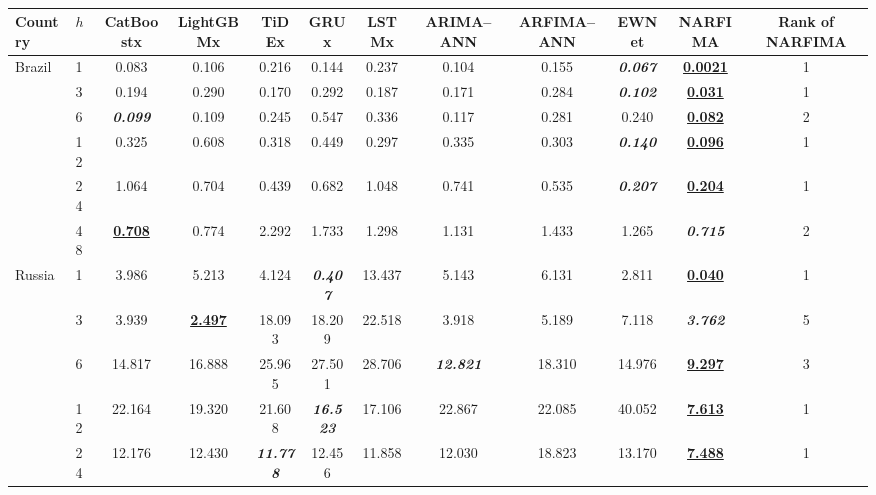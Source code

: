 \begin{table}[!htbp]
\caption{}
\centering
\begin{adjustbox}{width=\textwidth}
\begin{tabular}{llcccccccccc}
\hline
Country & $h$ & CatBoostx & LightGBMx & TiDEx & GRUx & LSTMx & ARIMA--ANN & ARFIMA--ANN & EWNet & NARFIMA & Rank of NARFIMA \\\hline
\multirow{6}{*}{Brazil} & 1 & 0.083 & 0.106 & 0.216 & 0.144 & 0.237 & 0.104 & 0.155 & \textbf{\textit{0.067}} & \textbf{\underline{0.0021}} & 1 \\
 & 3 & 0.194 & 0.290 & 0.170 & 0.292 & 0.187 & 0.171 & 0.284 & \textbf{\textit{0.102}} & \textbf{\underline{0.031}} & 1 \\
 & 6 & \textbf{\textit{0.099}} & 0.109 & 0.245 & 0.547 & 0.336 & 0.117 & 0.281 & 0.240 & \textbf{\underline{0.082}} & 2 \\
 & 12 & 0.325 & 0.608 & 0.318 & 0.449 & 0.297 & 0.335 & 0.303 & \textbf{\textit{0.140}} & \textbf{\underline{0.096}} & 1 \\
 & 24 & 1.064 & 0.704 & 0.439 & 0.682 & 1.048 & 0.741 & 0.535 & \textbf{\textit{0.207}} & \textbf{\underline{0.204}} & 1 \\
 & 48 & \textbf{\underline{0.708}} & 0.774 & 2.292 & 1.733 & 1.298 & 1.131 & 1.433 & 1.265 & \textbf{\textit{0.715}} & 2 \\
\hline
\multirow{6}{*}{Russia} & 1 & 3.986 & 5.213 & 4.124 & \textbf{\textit{0.407}} & 13.437 & 5.143 & 6.131 & 2.811 & \textbf{\underline{0.040}} & 1 \\
 & 3 & 3.939 & \textbf{\underline{2.497}} & 18.093 & 18.209 & 22.518 & 3.918 & 5.189 & 7.118 & \textbf{\textit{3.762}} & 5 \\
 & 6 & 14.817 & 16.888 & 25.965 & 27.501 & 28.706 & \textbf{\textit{12.821}} & 18.310 & 14.976 & \textbf{\underline{9.297}} & 3 \\
 & 12 & 22.164 & 19.320 & 21.608 & \textbf{\textit{16.523}} & 17.106 & 22.867 & 22.085 & 40.052 & \textbf{\underline{7.613}} & 1 \\
 & 24 & 12.176 & 12.430 & \textbf{\textit{11.778}} & 12.456 & 11.858 & 12.030 & 18.823 & 13.170 & \textbf{\underline{7.488}} & 1 \\

\end{tabular}
\end{adjustbox}
\end{table}
